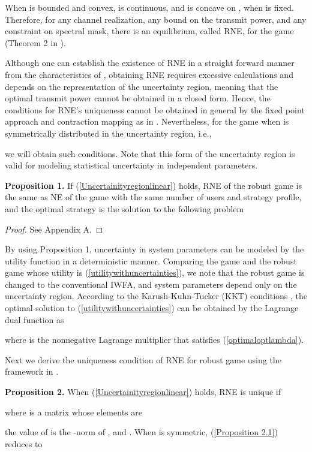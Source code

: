 \documentclass[peerreview,onecolumn,11pt,draftclsnofoot]{IEEEtran}\usepackage{amsmath}\usepackage{amsfonts}\usepackage{epsfig}\usepackage{amssymb}\usepackage{graphicx}\usepackage{amssymb,amsmath}\usepackage{cite}\usepackage{color,soul}\newcommand\T{\rule{0pt}{3.1ex}}
\begin{document}
When  is bounded and convex,
 is continuous, and is concave on , when  is fixed. Therefore, for any channel realization, any bound on the transmit power, and any constraint on spectral mask, there is an equilibrium, called RNE, for the game  (Theorem 2 in \cite{Robustgame}).

Although one can establish the existence of RNE in a straight forward manner from the characteristics of , obtaining RNE requires excessive calculations and depends on the representation of the uncertainty region, meaning that the optimal transmit power cannot be obtained in a closed form. Hence, the conditions for RNE's uniqueness cannot be obtained in general by the fixed point approach and contraction mapping as in \cite{Nash1,Nash2}. Nevertheless, for the game  when   is symmetrically distributed in the uncertainty region, i.e.,

we will obtain such conditions. Note that this form of the uncertainty region is valid for modeling statistical uncertainty in independent parameters.

\textbf{Proposition 1.} If (\ref{Uncertainityregionlinear}) holds, RNE of the robust game  is the same as NE of the game  with the same number of users and strategy profile, and the optimal strategy is the solution to the following problem


\begin{proof}
See Appendix A.
\end{proof}
By using Proposition 1, uncertainty in system parameters can be modeled by the utility function in a deterministic manner.
Comparing the game  and the robust game  whose utility is (\ref{utilitywithuncertainties}), we note that the robust game  is changed to the conventional IWFA, and system parameters depend only on the uncertainty region. According to the Karush-Kuhn-Tucker (KKT) conditions \cite{boydconvexbook}, the optimal solution to (\ref{utilitywithuncertainties}) can be obtained by the Lagrange dual function as

where  is the
nonnegative Lagrange multiplier that satisfies
(\ref{optimaloptlambda}).

Next we derive the uniqueness condition of RNE for robust game using the framework in \cite{Nash1}.

\textbf{Proposition 2.} When (\ref{Uncertainityregionlinear}) holds, RNE is unique if

where  is a  matrix whose elements are

the value of  is the -norm of , and . When  is symmetric, (\ref{Proposition 2.1}) reduces to
\end{document}
